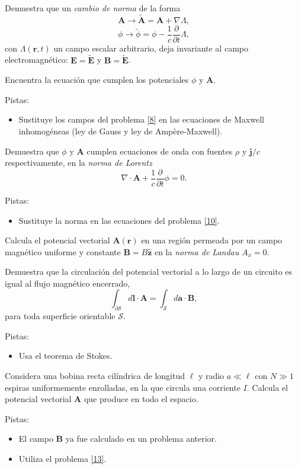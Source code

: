 \documentclass{exam}
\begin{document}
\begin{questions}
\question \label{9} Demuestra que un {\em cambio de norma} de la forma
  $$
  \bm A\to \bm \tilde{\bm A}=\bm A+\nabla\Lambda,
  $$
  $$
  \phi \to \tilde\phi=\phi-\frac{1}{c}\frac{\partial}{\partial t}\Lambda,
  $$
  con $\Lambda(\bm r,t)$ un campo escalar arbitrario, deja invariante
  al campo electromagnético: $\bm E=\tilde{\bm E}$ y $\bm
  B=\tilde{\bm E}$.

\question\label{10} Encuentra la ecuación que cumplen los potenciales $\phi$ y
  $\bm A$.


  Pistas:
  \begin{itemize}
  \item Sustituye los campos del problema \ref{8} en las ecuaciones de
    Maxwell inhomogéneas (ley de Gauss y ley de Ampère-Maxwell).
  \end{itemize}
\question \label{11}  Demuestra que $\phi$ y $\bm A$ cumplen ecuaciones de onda
  con fuentes $\rho$ y $\bm j/c$ respectivamente, en la {\em norma de
    Lorentz}
  $$\nabla\cdot\bm A+\frac{1}{c}\frac{\partial}{\partial t}\phi=0.$$

  Pistas:
  \begin{itemize}
  \item Sustituye la norma en las ecuaciones del problema \ref{10}.
  \end{itemize}


\question\label{12} Calcula el potencial vectorial $\bm A(\bm r)$ en una región
  permeada por un campo magnético uniforme y constante $\bm
  B=B\hat{\bm z}$ en la {\em norma de Landau} $A_x=0$.


\question\label{13} Demuestra que la circulación del potencial
  vectorial a lo largo de un circuito es igual al flujo magnético
  encerrado,
  $$
  \int_{\partial\mathcal S} d\bm l\cdot\bm A=\int_{\mathcal S}d\bm
  a\cdot\bm B,
  $$
  para toda superficie orientable $\mathcal S$.

  Pistas:
  \begin{itemize}
  \item Usa el teorema de Stokes.
  \end{itemize}
\question\label{14} Considera una bobina recta cilíndrica de longitud
  $\ell$ y radio $a\ll \ell$ con $N\gg 1$ espiras uniformemente
  enrolladas, en la que circula una corriente $I$. Calcula el
  potencial vectorial $\bm A$ que produce en todo el espacio.

  Pistas:
  \begin{itemize}
  \item El campo $\bm B$ ya fue calculado en un problema anterior.
  \item Utiliza el problema \ref{13}.
  \end{itemize}



\end{questions}
\end{document}
